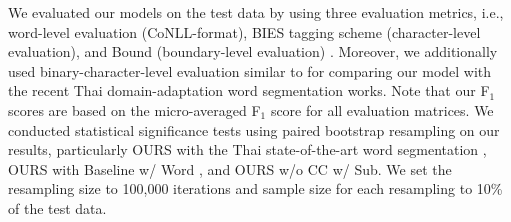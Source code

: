 We evaluated our models on the test data by using three evaluation metrics, i.e., word-level evaluation (CoNLL-format), BIES tagging scheme (character-level evaluation), and Bound (boundary-level evaluation) \cite{seeha-etal-2020-thailmcut}.
%
Moreover, we additionally used binary-character-level evaluation similar to  for comparing our model with the recent Thai domain-adaptation word segmentation works.
%
%
Note that our F$_{1}$ scores are based on the micro-averaged F$_{1}$ score for all evaluation matrices.
%
We conducted statistical significance tests using paired bootstrap resampling \cite{Koehn2004} on our results, particularly OURS with the Thai state-of-the-art word segmentation \cite{seeha-etal-2020-thailmcut}, OURS with Baseline w/ Word \cite{higashinaka-etal-2021-integrated}, and OURS w/o CC w/ Sub.
%  
We set the resampling size to 100,000 iterations and sample size for each resampling to 10\% of the test data.

